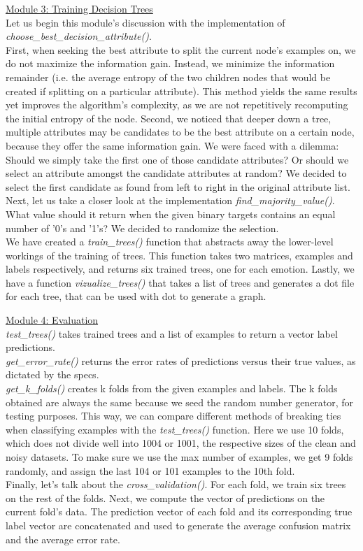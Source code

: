\underline{Module 3: Training Decision Trees} \\
Let us begin this module's discussion with the implementation of  \emph{choose\_best\_decision\_attribute()}. \\
First, when seeking the best attribute to split the current node's examples on, we do not maximize the information gain.
Instead, we minimize the information remainder (i.e. the average entropy of the two children nodes
that would be created if splitting on a particular attribute).
This method yields the same results yet improves the algorithm's complexity,
as we are not repetitively recomputing the initial entropy of the node.
Second, we noticed that deeper down a tree, multiple attributes may be candidates to be the best attribute on a certain node,
because they offer the same information gain. We were faced with a dilemma: Should we simply
take the first one of those candidate attributes? Or should we select an attribute amongst the candidate attributes at random?
We decided to select the first candidate as found from left to right in the original attribute list.\\
Next, let us take a closer look at the implementation \emph{find\_majority\_value()}.\\
What value should it return when the given binary targets contains an equal number of
'0's and '1's? We decided to randomize the selection.\\
We have created a \emph{train\_trees()} function that abstracts away the lower-level workings of the training
of trees. This function takes two matrices, examples and labels respectively,
and returns six trained trees, one for each emotion.
Lastly, we have a function \emph{vizualize\_trees()} that takes a list of trees and generates a dot file
for each tree, that can be used with dot to generate a graph.

\underline{Module 4: Evaluation} \\
\emph{test\_trees()} takes trained trees and a list of examples to return a vector label predictions.\\
\emph{get\_error\_rate()} returns the error rates of predictions versus their true values, as dictated by the specs.\\
\emph{get\_k\_folds()} creates k folds from the given examples and labels. The k folds obtained are always the same
because we seed the random number generator, for testing purposes.
This way, we can compare different methods of breaking ties when classifying examples with the \emph{test\_trees()} function.
Here we use 10 folds, which does not divide well into 1004 or 1001, the respective sizes of the clean and noisy datasets.
To make sure we use the max number of examples, we get 9 folds randomly, and assign the last 104 or 101 examples to the
10th fold.\\
Finally, let's talk about the \emph{cross\_validation()}.
For each fold, we train six trees on the rest of the folds. Next, we compute the vector of predictions on the current fold's data.
The prediction vector of each fold and its corresponding true label vector are concatenated and used to generate the average confusion
matrix and the average error rate.
